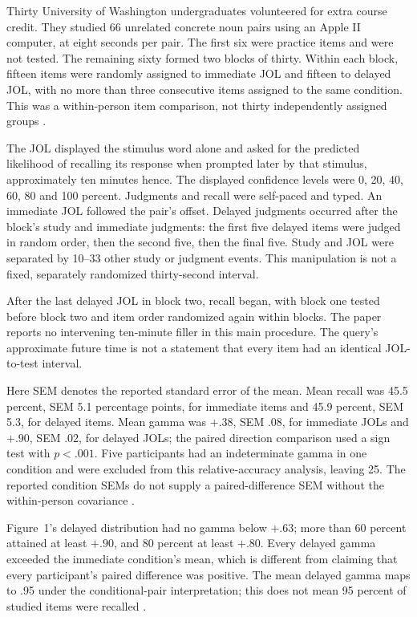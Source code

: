 Thirty University of Washington undergraduates volunteered for extra
course credit. They studied 66 unrelated concrete noun pairs using an
Apple II computer, at eight seconds per pair. The first six were
practice items and were not tested. The remaining sixty formed two
blocks of thirty. Within each block, fifteen items were randomly
assigned to immediate JOL and fifteen to delayed JOL, with no more
than three consecutive items assigned to the same condition.
This was a within-person item comparison, not thirty independently
assigned groups \cite[p.~268]{NelsonDunlosky1991DelayedJOL}.

The JOL displayed the stimulus word alone and asked for the predicted
likelihood of recalling its response when prompted later by that
stimulus, approximately ten minutes hence. The displayed confidence
levels were 0, 20, 40, 60, 80 and 100 percent. Judgments and recall were
self-paced and typed. An immediate JOL followed the pair's offset.
Delayed judgments occurred after the block's study and immediate
judgments: the first five delayed items were judged in random order,
then the second five, then the final five. Study and JOL were
separated by 10--33 other study or judgment events.
This manipulation is not a fixed, separately randomized
thirty-second interval.

After the last delayed JOL in block two, recall began, with block one
tested before block two and item order randomized again within blocks.
The paper reports no intervening ten-minute filler in this main
procedure. The query's approximate future time is not a statement
that every item had an identical JOL-to-test interval.

Here SEM denotes the reported standard error of the mean.
Mean recall was 45.5 percent, SEM 5.1 percentage points, for immediate
items and 45.9 percent, SEM 5.3, for delayed items.
Mean gamma was \(+.38\), SEM .08, for immediate JOLs and \(+.90\),
SEM .02, for delayed JOLs; the paired direction comparison used a
sign test with \(p<.001\).
Five participants had an indeterminate gamma in one condition and
were excluded from this relative-accuracy analysis, leaving 25.
The reported condition SEMs do not supply a paired-difference SEM
without the within-person covariance
\cite[p.~268 and note~2]{NelsonDunlosky1991DelayedJOL}.

Figure~1's delayed distribution had no gamma below \(+.63\);
more than 60 percent attained at least \(+.90\), and 80 percent
at least \(+.80\). Every delayed gamma exceeded the immediate
condition's mean, which is different from claiming that every
participant's paired difference was positive.
The mean delayed gamma maps to .95 under the conditional-pair
interpretation; this does not mean 95 percent of studied items
were recalled \cite[p.~269]{NelsonDunlosky1991DelayedJOL}.

